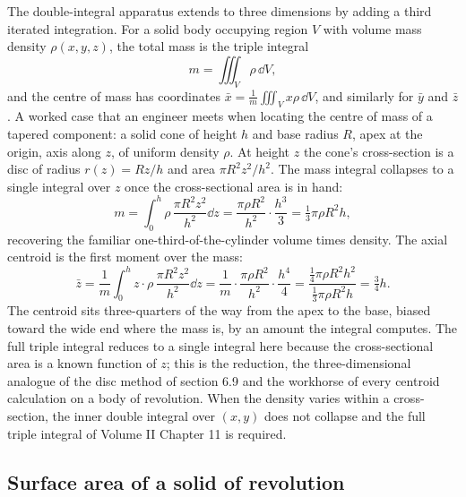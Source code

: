 The double-integral apparatus extends to three dimensions by adding a
third iterated integration. For a solid body occupying region $V$ with
volume mass density $\rho(x, y, z)$, the total mass is the triple
integral
\[
m = \iiint_{V}\rho\,\dd V,
\]
and the centre of mass has coordinates $\bar{x} = \frac{1}{m}\iiint_{V}
x\rho\,\dd V$, and similarly for $\bar{y}$ and $\bar{z}$. A worked
case that an engineer meets when locating the centre of mass of a
tapered component: a solid cone of height $h$ and base radius $R$,
apex at the origin, axis along $z$, of uniform density $\rho$. At
height $z$ the cone's cross-section is a disc of radius $r(z) = Rz/h$
and area $\pi R^{2}z^{2}/h^{2}$. The mass integral collapses to a
single integral over $z$ once the cross-sectional area is in hand:
\[
m = \int_{0}^{h}\rho\,\frac{\pi R^{2}z^{2}}{h^{2}}\dd z =
\frac{\pi\rho R^{2}}{h^{2}}\cdot\frac{h^{3}}{3} =
\tfrac{1}{3}\pi\rho R^{2}h,
\]
recovering the familiar one-third-of-the-cylinder volume times
density. The axial centroid is the first moment over the mass:
\[
\bar{z} = \frac{1}{m}\int_{0}^{h} z\cdot\rho\,\frac{\pi R^{2}z^{2}}
{h^{2}}\dd z = \frac{1}{m}\cdot\frac{\pi\rho R^{2}}{h^{2}}\cdot
\frac{h^{4}}{4} = \frac{\tfrac{1}{4}\pi\rho R^{2}h^{2}}
{\tfrac{1}{3}\pi\rho R^{2}h} = \tfrac{3}{4}h.
\]
The centroid sits three-quarters of the way from the apex to the
base, biased toward the wide end where the mass is, by an amount the
integral computes. The full triple integral reduces to a single
integral here because the cross-sectional area is a known function of
$z$; this is the  reduction, the three-dimensional
analogue of the disc method of section 6.9 and the workhorse of every
centroid calculation on a body of revolution. When the density varies
within a cross-section, the inner double integral over $(x, y)$ does
not collapse and the full triple integral of Volume II Chapter 11 is
required.

\subsection{Surface area of a solid of revolution}

